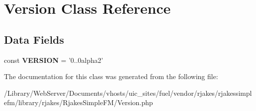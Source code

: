 \hypertarget{classrjakes_1_1_rjakes_simple_f_m_1_1_version}{\section{Version Class Reference}
\label{classrjakes_1_1_rjakes_simple_f_m_1_1_version}
}
\subsection*{Data Fields}
\begin{DoxyCompactItemize}
\item 
\hypertarget{classrjakes_1_1_rjakes_simple_f_m_1_1_version_af71005841ce53adac00581ab0ba24c1f}{const {\bfseries V\+E\+R\+S\+I\+O\+N} = '0..\+0alpha2'}\label{classrjakes_1_1_rjakes_simple_f_m_1_1_version_af71005841ce53adac00581ab0ba24c1f}

\end{DoxyCompactItemize}


The documentation for this class was generated from the following file\+:\begin{DoxyCompactItemize}
\item 
/\+Library/\+Web\+Server/\+Documents/vhosts/uic\+\_\+sites/fuel/vendor/rjakes/rjakessimplefm/library/rjakes/\+Rjakes\+Simple\+F\+M/Version.\+php\end{DoxyCompactItemize}
